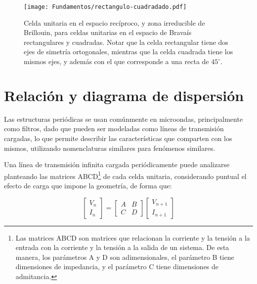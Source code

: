 \begin{figure}[htp]
	\centering
	\texttt{[image: Fundamentos/rectangulo-cuadradado.pdf]}
	\caption{Celda unitaria en el espacio recíproco, y zona irreducible de Brillouin, para celdas unitarias en el espacio de Bravaís rectangulares y cuadradas. Notar que la celda rectangular tiene dos ejes de simetría ortogonales, mientras que la celda cuadrada tiene los mismos ejes, y además con el que corresponde a una recta de $45^{\circ}$.}
	\label{fig:rectangulo-cuadrado}
\end{figure}



\section{Relación y diagrama de dispersión}
\label{sec:diag-de-dispersion}

Las estructuras periódicas se usan comúnmente en microondas, principalmente como filtros, dado que pueden ser modeladas como líneas de transmisión cargadas, lo que permite describir las características que comparten con los mismos, utilizando nomenclaturas similares para fenómenos similares.

Una línea de transmisión infinita cargada periódicamente puede analizarse planteando las matrices ABCD\footnote{Las matrices ABCD son matrices que relacionan la corriente y la tensión a la entrada con la corriente y la tensión a la salida de un sistema. De esta manera, los parámetros A y D son adimensionales, el parámetro B tiene dimensiones de impedancia, y el parámetro C tiene dimensiones de admitancia.} de cada celda unitaria, considerando puntual el efecto de carga que impone la geometría, de forma que:

\begin{equation}
	\begin{bmatrix}
		V_n \\
		I_n
	\end{bmatrix}
	=
	\begin{bmatrix}
		A & B \\
		C & D
	\end{bmatrix}
	\begin{bmatrix}
		V_{n+1} \\
		I_{n+1}
	\end{bmatrix}
\end{equation}

